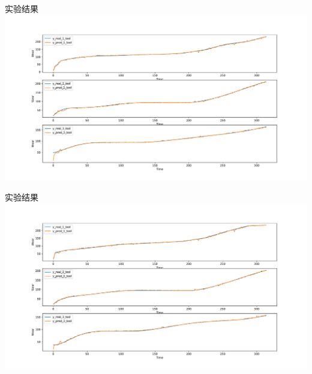 \documentclass[12pt,aspectratio=169]{beamer}
\begin{document}
	\begin{frame}{实验结果}
		\centering
		\includegraphics[height=0.9\textheight]{picture/y_tool}
		
	\end{frame}
	
	\begin{frame}{实验结果}
		\centering
		\includegraphics[height=0.9\textheight]{picture/z_tool}
		
	\end{frame}
	
\end{document}
